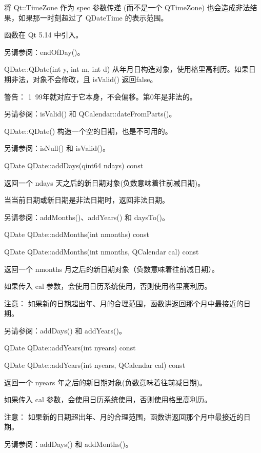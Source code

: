 将 Qt::TimeZone 作为 spec 参数传递 (而不是一个 QTimeZone) 也会造成非法结果，如果那一时刻超过了 QDateTime 的表示范围。

函数在 Qt 5.14 中引入。

另请参阅：endOfDay()。

\splitLine

QDate::QDate(int y, int m, int d)
从年月日构造对象，使用格里高利历。如果日期非法，对象不会修改，且 isValid() 返回false。

警告： 1~99年就对应于它本身，不会偏移。第0年是非法的。

另请参阅：isValid() 和 QCalendar::dateFromParts()。

\splitLine

QDate::QDate()
构造一个空的日期，也是不可用的。

另请参阅：isNull() 和 isValid()。

\splitLine

QDate QDate::addDays(qint64 ndays) const

返回一个 ndays 天之后的新日期对象(负数意味着往前减日期)。

当当前日期或新日期是非法日期时，返回非法日期。

另请参阅：addMonths()、addYears() 和 daysTo()。

\splitLine

QDate QDate::addMonths(int nmonths) const

QDate QDate::addMonths(int nmonths, QCalendar cal) const

返回一个 nmonths 月之后的新日期对象（负数意味着往前减日期）。

如果传入 cal 参数，会使用日历系统使用，否则使用格里高利历。

注意： 如果新的日期超出年、月的合理范围，函数讲返回那个月中最接近的日期。

另请参阅：addDays() 和 addYears()。

\splitLine

QDate QDate::addYears(int nyears) const

QDate QDate::addYears(int nyears, QCalendar cal) const

返回一个 nyears 年之后的新日期对象(负数意味着往前减日期)。

如果传入 cal 参数，会使用日历系统使用，否则使用格里高利历。

注意： 如果新的日期超出年、月的合理范围，函数讲返回那个月中最接近的日期。

另请参阅：addDays() 和 addMonths()。

\splitLine

